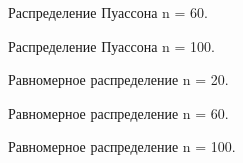 \begin{figure}[H]
	\caption{ Распределение Пуассона n = 60.}
	\label{ris:26}
\end{figure}
\begin{figure}[H]
	\caption{ Распределение Пуассона n = 100.}
	\label{ris:27}
\end{figure}
\begin{figure}[H]
	\caption{ Равномерное распределение n = 20.}
	\label{ris:28}
\end{figure}
\begin{figure}[H]
	\caption{ Равномерное распределение n = 60.}
	\label{ris:29}
\end{figure}
\begin{figure}[H]
	\caption{ Равномерное распределение n = 100.}
	\label{ris:30}
\end{figure}